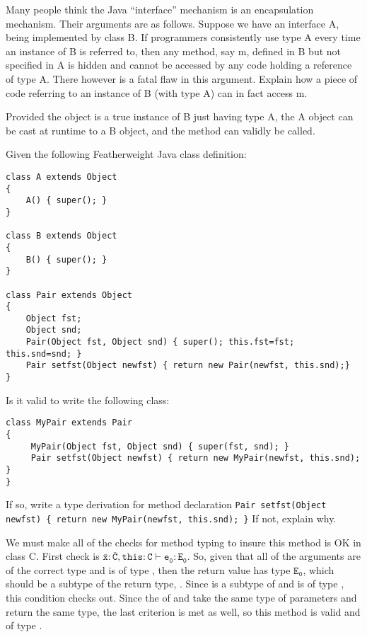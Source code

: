 \documentclass[12pt,letterpaper]{hmcpset}
\begin{document}
\begin{problem}[7]
Many people think the Java ``interface'' mechanism is an encapsulation mechanism.  Their arguments are as follows. Suppose we have an interface A, being implemented by class B. If programmers consistently use type A every time an instance of B is referred to, then any method, say m, defined in B but not specified in A is hidden and cannot be accessed by any code holding a reference of type A. There however is a fatal flaw in this argument. Explain how a piece of code referring to an instance of B (with type A) can in fact access m.
\end{problem}

\begin{solution}
Provided the object is a true instance of B just having type A, the A object can be cast at runtime to a B object, and the method can validly be called.
\end{solution}

\begin{problem}[8]
Given the following Featherweight Java class definition:
\begin{verbatim}
class A extends Object 
{ 
    A() { super(); } 
} 

class B extends Object 
{ 
    B() { super(); } 
} 

class Pair extends Object 
{ 
    Object fst; 
    Object snd; 
    Pair(Object fst, Object snd) { super(); this.fst=fst; this.snd=snd; } 
    Pair setfst(Object newfst) { return new Pair(newfst, this.snd);} 
} 
\end{verbatim}
\end{problem}

\begin{problem}[8a]
Is it valid to write the following class:
\begin{verbatim}
class MyPair extends Pair
{
     MyPair(Object fst, Object snd) { super(fst, snd); } 
     Pair setfst(Object newfst) { return new MyPair(newfst, this.snd); } 
}
\end{verbatim}
If so, write a type derivation for method declaration \verb|Pair setfst(Object newfst) { return new MyPair(newfst, this.snd); }| If not, explain why.
\end{problem}

\begin{solution}
We must make all of the checks for method typing to insure this method is OK in class C.  First check is $\bar{\mathtt{x}}:\bar{\mathtt{C}}, \mathtt{this}:\mathtt{C}\vdash \mathtt{e_0}:\mathtt{E_0}$. So, given that all of the arguments are of the correct type and  is of type , then the return value has type $\mathtt{E_0}$, which should be a subtype of the return type, .  Since  is a subtype of  and  is of type , this condition checks out.  Since the  of  and  take the same type of parameters and return the same type, the last criterion is met as well, so this method is valid and of type .
\end{solution}
\end{document}
